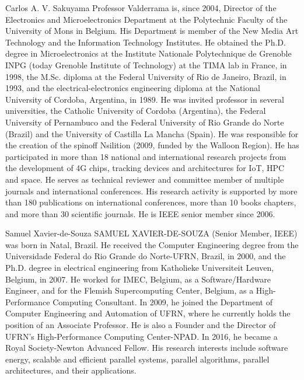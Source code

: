 \documentclass{ieeeaccess}
\begin{document}
\begin{IEEEbiography}{Carlos A. V. Sakuyama}
Professor Valderrama is, since 2004, Director of the Electronics and Microelectronics Department at the Polytechnic Faculty of the University of Mons in Belgium.  His Department is member of the New Media Art Technology and the Information Technology Institutes. He obtained the Ph.D. degree in Microelectronics at the Institute Nationale Polytechnique de Grenoble INPG (today Grenoble Institute of Technology) at the TIMA lab in France, in 1998, the M.Sc. diploma at the Federal University of Rio de Janeiro, Brazil, in 1993, and the electrical-electronics engineering diploma at the National University of Cordoba, Argentina, in 1989. He was invited professor in several universities, the Catholic University of Cordoba (Argentina), the Federal University of Pernambuco and the Federal University of Rio Grande do Norte (Brazil) and the University of Castilla La Mancha (Spain). He was responsible for the creation of the spinoff Nsilition (2009, funded by the Walloon Region). He has participated in more than 18 national and international research projects from the development of 4G chips, tracking devices and architectures for IoT, HPC and space.  He serves as technical reviewer and committee member of multiple journals and international conferences. His research activity is supported by more than 180 publications on international conferences, more than 10 books chapters, and more than 30 scientific journals. He is IEEE senior member since 2006.
\end{IEEEbiography}

\begin{IEEEbiography}{Samuel Xavier-de-Souza}
SAMUEL XAVIER-DE-SOUZA (Senior Member, IEEE) was born in Natal, Brazil. He received the Computer Engineering degree from the Universidade Federal do Rio Grande do Norte-UFRN, Brazil, in 2000, and the Ph.D. degree in electrical engineering from Katholieke Universiteit Leuven, Belgium, in 2007. He worked for IMEC, Belgium, as a Software/Hardware Engineer, and for the Flemish Supercomputing Center, Belgium, as a High-Performance Computing Consultant. In 2009, he joined the Department of Computer Engineering and Automation of UFRN, where he currently holds the position of an Associate Professor. He is also a Founder and the Director of UFRN’s High-Performance Computing Center-NPAD. In 2016, he became a Royal Society-Newton Advanced Fellow. His research interests include software energy, scalable and efficient parallel systems, parallel algorithms, parallel architectures, and their applications.
\end{IEEEbiography}

\EOD
\end{document}
